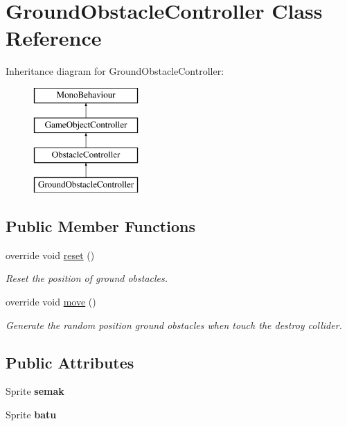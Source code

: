 \hypertarget{class_ground_obstacle_controller}{}\section{Ground\+Obstacle\+Controller Class Reference}
\label{class_ground_obstacle_controller}
Inheritance diagram for Ground\+Obstacle\+Controller\+:\begin{figure}[H]
\begin{center}
\leavevmode
\includegraphics[height=4.000000cm]{class_ground_obstacle_controller}
\end{center}
\end{figure}
\subsection*{Public Member Functions}
\begin{DoxyCompactItemize}
\item 
override void \hyperlink{class_ground_obstacle_controller_ab218c8d1be89a93ab3c0a18ba3fc9d67}{reset} ()
\begin{DoxyCompactList}\small\item\em Reset the position of ground obstacles. \end{DoxyCompactList}\item 
override void \hyperlink{class_ground_obstacle_controller_aad450d16fef8b23f848f87a81d1790a8}{move} ()
\begin{DoxyCompactList}\small\item\em Generate the random position ground obstacles when touch the destroy collider. \end{DoxyCompactList}\end{DoxyCompactItemize}
\subsection*{Public Attributes}
\begin{DoxyCompactItemize}
\item 
\hypertarget{class_ground_obstacle_controller_a04079c11e4ef4255f0941537295c6529}{}\label{class_ground_obstacle_controller_a04079c11e4ef4255f0941537295c6529} 
Sprite {\bfseries semak}
\item 
\hypertarget{class_ground_obstacle_controller_afca6892eb1f8ac1f08bc29bcc2955f3d}{}\label{class_ground_obstacle_controller_afca6892eb1f8ac1f08bc29bcc2955f3d} 
Sprite {\bfseries batu}
\end{DoxyCompactItemize}
